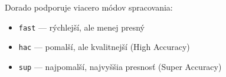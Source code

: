 Dorado podporuje viacero módov spracovania:
\begin{itemize}
    \item \texttt{fast} — rýchlejší, ale menej presný
    \item \texttt{hac} — pomalší, ale kvalitnejší (High Accuracy)
    \item \texttt{sup} — najpomalší, najvyššia presnosť (Super Accuracy)
\end{itemize}
